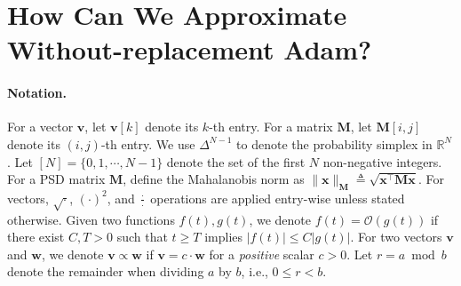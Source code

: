 \documentclass{article} %
\theoremstyle{plain}
\theoremstyle{definition}
\theoremstyle{remark}
\def\sR{{\mathbb{R}}}
\def\bx{{\mathbf x}}
\def\bw{{\mathbf w}}
\def\bv{{\mathbf v}}
\def\bM{{\mathbf M}}
\begin{document}
\section{How Can We Approximate Without-replacement Adam?} \label{sec:approx_Adam}

\paragraph{Notation.}
For a vector $\bv$, let $\bv[k]$ denote its $k$-th entry. For a matrix $\bM$, let $\bM[i, j]$ denote its $(i, j)$-th entry. We use $\Delta^{N-1}$ to denote the probability simplex in $\sR^N$. Let $[N]=\{0, 1, \cdots, N-1\}$ denote the set of the first $N$ non-negative integers. For a PSD matrix $\bM$, define the Mahalanobis norm as $\|\bx\|_\bM \triangleq \sqrt{\bx^\top \bM \bx}$. For vectors, $\sqrt{\cdot}$, $(\cdot)^2$, and $\frac{\cdot}{\cdot}$ operations are applied entry-wise unless stated otherwise. Given two functions $f(t), g(t)$, we denote $f(t) = \mathcal{O}(g(t))$ if there exist $C, T>0$ such that $t \geq T$ implies $|f(t)| \leq C|g(t)|$. For two vectors $\bv$ and $\bw$, we denote $\bv \propto \bw$ if $\bv = c\cdot\bw$ for a \textit{positive} scalar $c>0$. Let $r=a \bmod b$ denote the remainder when dividing $a$ by $b$, i.e., $0\leq r<b$.

\vspace{-3pt}
\end{document}
